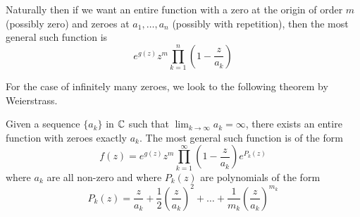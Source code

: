 Naturally then if we want an entire function with a zero at the origin of order $m$ (possibly zero) and zeroes at $a_1, \dots, a_n$ (possibly with repetition), then the most general such function is 
$$e^{g(z)} z^m \prod_{k = 1}^n \left(1 - \frac{z}{a_k} \right)$$

For the case of infinitely many zeroes, we look to the following theorem by Weierstrass.
\begin{theorem}[Weierstrass]
    Given a sequence $\{a_k\}$ in $\mathbb{C}$ such that $\lim_{k \to \infty} a_k = \infty$, there exists an entire function with zeroes exactly $a_k$. The most general such function is of the form 
    $$f(z) = e^{g(z)} z^m \prod_{k = 1}^\infty \left(1 - \frac{z}{a_k} \right) e^{P_k(z)}$$
    where $a_k$ are all non-zero and where $P_k(z)$ are polynomials of the form
    $$P_k(z) = \frac{z}{a_k} + \frac{1}{2} \left( \frac{z}{a_k} \right)^2 + \dots + \frac{1}{m_k} \left( \frac{z}{a_k} \right)^{m_k}$$
\end{theorem}
